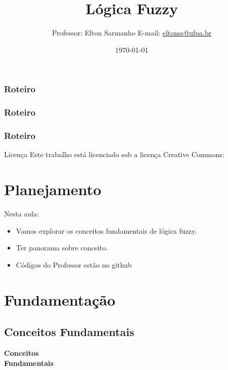 \documentclass{beamer}
\title[]{Lógica Fuzzy}
\author[Elton Sarmanho]{ 
Professor: Elton Sarmanho\inst{1} 
\newline
E-mail: \href{mailto:eltonss@ufpa.br}{eltonss@ufpa.br}\newline
\href{https://github.com/eltonsarmanho}{\faGithub} \href{https://www.linkedin.com/in/elton-sarmanho-836553185/}{\faLinkedinSquare}\\
\ccbyncsa
}
\institute[UFPA]{
   \inst{1}%
     Faculdade de Sistemas de Informação - UFPA/CUNTINS
     }
\date{\today}
\begin{document}
\begin{frame}
\titlepage
\end{frame}

\begin{frame}
\frametitle{Roteiro}
\tableofcontents[sections={1-3}]
\end{frame}
\begin{frame}
\frametitle{Roteiro}
\tableofcontents[sections={4-6}]
\end{frame}

\begin{frame}
\frametitle{Roteiro}
\tableofcontents[sections={7-8}]
\end{frame}
\begin{frame}{Licença}
    Este trabalho está licenciado sob a licença Creative Commons:

    \bigskip
    \ccbyncsa
\end{frame}

\section{Planejamento}

\begin{frame}
Nesta aula:

\begin{itemize}
 \item Vamos explorar os conceitos fundamentais de lógica fuzzy.
 \item Ter panorama sobre conceito.
 \item Códigos do Professor estão no github
\end{itemize}


\end{frame}

\section{Fundamentação}
\subsection{Conceitos Fundamentais}
\begin{frame}
\centering
\Huge
\textbf{Conceitos\\Fundamentais}
\end{frame}
\end{document}
